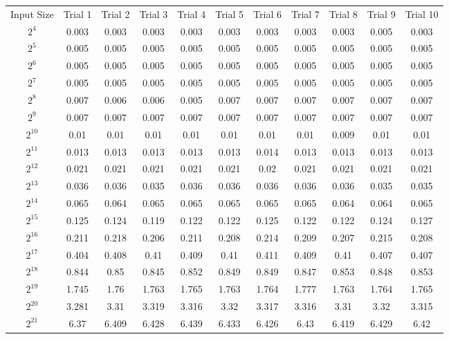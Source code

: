 \begin{center}
\begin{landscape}
    \begin{tabular}{c|c|c|c|c|c|c|c|c|c|c}
     Input Size & Trial 1 & Trial 2 & Trial 3 & Trial 4 & Trial 5 & Trial 6 & Trial 7 & Trial 8 & Trial 9 & Trial 10 \\
$2^{4}$ & 0.003 & 0.003 & 0.003 & 0.003 & 0.003 & 0.003 & 0.003 & 0.003 & 0.005 & 0.003 \\ 
$2^{5}$ & 0.005 & 0.005 & 0.005 & 0.005 & 0.005 & 0.005 & 0.005 & 0.005 & 0.005 & 0.005 \\ 
$2^{6}$ & 0.005 & 0.005 & 0.005 & 0.005 & 0.005 & 0.005 & 0.005 & 0.005 & 0.005 & 0.005 \\ 
$2^{7}$ & 0.005 & 0.005 & 0.005 & 0.005 & 0.005 & 0.005 & 0.005 & 0.005 & 0.005 & 0.005 \\ 
$2^{8}$ & 0.007 & 0.006 & 0.006 & 0.005 & 0.007 & 0.007 & 0.007 & 0.007 & 0.007 & 0.007 \\ 
$2^{9}$ & 0.007 & 0.007 & 0.007 & 0.007 & 0.007 & 0.007 & 0.007 & 0.007 & 0.007 & 0.007 \\ 
$2^{10}$ & 0.01 & 0.01 & 0.01 & 0.01 & 0.01 & 0.01 & 0.01 & 0.009 & 0.01 & 0.01 \\ 
$2^{11}$ & 0.013 & 0.013 & 0.013 & 0.013 & 0.013 & 0.014 & 0.013 & 0.013 & 0.013 & 0.013 \\ 
$2^{12}$ & 0.021 & 0.021 & 0.021 & 0.021 & 0.021 & 0.02 & 0.021 & 0.021 & 0.021 & 0.021 \\ 
$2^{13}$ & 0.036 & 0.036 & 0.035 & 0.036 & 0.036 & 0.036 & 0.036 & 0.036 & 0.035 & 0.035 \\ 
$2^{14}$ & 0.065 & 0.064 & 0.065 & 0.065 & 0.065 & 0.065 & 0.065 & 0.064 & 0.064 & 0.065 \\ 
$2^{15}$ & 0.125 & 0.124 & 0.119 & 0.122 & 0.122 & 0.125 & 0.122 & 0.122 & 0.124 & 0.127 \\ 
$2^{16}$ & 0.211 & 0.218 & 0.206 & 0.211 & 0.208 & 0.214 & 0.209 & 0.207 & 0.215 & 0.208 \\ 
$2^{17}$ & 0.404 & 0.408 & 0.41 & 0.409 & 0.41 & 0.411 & 0.409 & 0.41 & 0.407 & 0.407 \\ 
$2^{18}$ & 0.844 & 0.85 & 0.845 & 0.852 & 0.849 & 0.849 & 0.847 & 0.853 & 0.848 & 0.853 \\ 
$2^{19}$ & 1.745 & 1.76 & 1.763 & 1.765 & 1.763 & 1.764 & 1.777 & 1.763 & 1.764 & 1.765 \\ 
$2^{20}$ & 3.281 & 3.31 & 3.319 & 3.316 & 3.32 & 3.317 & 3.316 & 3.31 & 3.32 & 3.315 \\ 
$2^{21}$ & 6.37 & 6.409 & 6.428 & 6.439 & 6.433 & 6.426 & 6.43 & 6.419 & 6.429 & 6.42 \\ 

\end{tabular}
\end{landscape}
\end{center}
